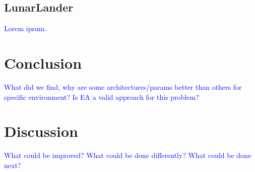 \documentclass{article}
\newcommand{\TODO}[1]{\textcolor{blue}{#1}}
\begin{document}
\subsection{LunarLander}
\label{ssec:ll}

\TODO{Lorem ipsum.}

\section{Conclusion}
\label{sec:conc}

\TODO{
    What did we find, why are some architectures/params better than others for specific environment?
    Is EA a valid approach for this problem?
}

\section{Discussion}
\label{sec:disc}

\TODO{
    What could be improved?
    What could be done differently?
    What could be done next?
}


\end{document}
